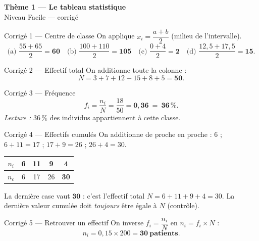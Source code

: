 \documentclass[11pt,a4paper]{article}
\newcommand{\bandeau}[2]{%
\begin{tcolorbox}[boxbase,colback=primary,colframe=primarydark,halign=center,
   before skip=2pt,after skip=12pt]
{\LARGE\bfseries\color{white} #1}\\[3pt]{\normalsize\color{white} #2}
\end{tcolorbox}}
\begin{document}
\bandeau{Thème 1 — Le tableau statistique}{Niveau Facile — corrigé}

\begin{corbox}{Corrigé 1 — Centre de classe}
On applique $x_i=\dfrac{a+b}{2}$ (milieu de l'intervalle).
\[
\text{(a) } \frac{55+65}{2}=\mathbf{60}\quad
\text{(b) } \frac{100+110}{2}=\mathbf{105}\quad
\text{(c) } \frac{0+4}{2}=\mathbf{2}\quad
\text{(d) } \frac{12{,}5+17{,}5}{2}=\mathbf{15}.
\]
\end{corbox}

\begin{corbox}{Corrigé 2 — Effectif total}
On additionne toute la colonne :
\[ N=3+7+12+15+8+5=\mathbf{50}. \]
\end{corbox}

\begin{corbox}{Corrigé 3 — Fréquence}
\[ f_i=\frac{n_i}{N}=\frac{18}{50}=\mathbf{0{,}36}\ =\ \mathbf{36\,\%}. \]
\emph{Lecture :} $36\,\%$ des individus appartiennent à cette classe.
\end{corbox}

\begin{corbox}{Corrigé 4 — Effectifs cumulés}
On additionne de proche en proche : $6$ ; $6+11=17$ ; $17+9=26$ ; $26+4=30$.
\begin{center}
\renewcommand{\arraystretch}{1.15}
\begin{tabular}{|c|c|c|c|c|}
\hline
$n_i$ & 6 & 11 & 9 & 4 \\\hline
$n_c$ & 6 & 17 & 26 & \textbf{30} \\\hline
\end{tabular}
\end{center}
La dernière case vaut $\mathbf{30}$ : c'est l'effectif total $N=6+11+9+4=30$. La dernière valeur
cumulée doit \emph{toujours} être égale à $N$ (contrôle).
\end{corbox}

\begin{corbox}{Corrigé 5 — Retrouver un effectif}
On inverse $f_i=\dfrac{n_i}{N}$ en $n_i=f_i\times N$ :
\[ n_i=0{,}15\times 200=\mathbf{30\ \text{patients}}. \]
\end{corbox}
\end{document}
